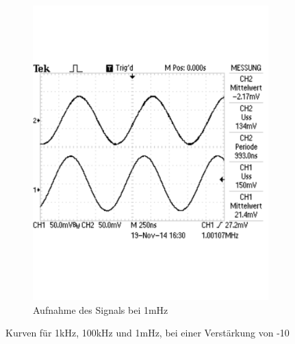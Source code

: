 \documentclass[12pt,a4paper]{article}
\begin{document}
\begin{figure}[H]
\begin{subfigure}[b]{0.28\textwidth}
                \includegraphics[width=\textwidth , scale = 0.4]{2_4_10_1m.pdf}
                \caption[Aufnahme des Signals bei 1mHz]{Aufnahme des Signals bei 1mHz}
  				\label{fig:2_4_10_1m}
        \end{subfigure}
        \caption{Kurven für 1kHz, 100kHz und 1mHz, bei einer Verstärkung von -10}
        \label{fig:2_4_10}
\end{figure}
\end{document}
